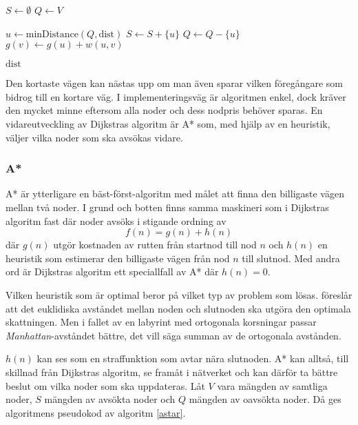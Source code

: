 \documentclass[11pt]{article}
\begin{document}
\begin{flushleft}
\begin{algorithm}
\begin{algorithmic}[1]
			\State $S \gets \emptyset$
			\State $Q \gets V$
			
				\State $u \gets \textrm{minDistance}(Q,\textrm{dist})$%
				\State $S \gets S +  \{ u\}$
				\State $Q \gets Q - \{ u\}$
						\State $g(v) \gets g(u) + w(u,v)$
					\EndIf
				\EndFor
			\EndWhile
			
			\Return $\textrm{dist}$
		\EndFunction
	\end{algorithmic}
\end{algorithm}

Den kortaste vägen kan nästas upp om man även sparar vilken föregångare som bidrog till en kortare väg. I implementeringsväg är algoritmen enkel, dock kräver den mycket minne eftersom alla noder och dess nodpris behöver sparas. En vidareutveckling av Dijkstras algoritm är A* som, med hjälp av en heuristik, väljer vilka noder som ska avsökas vidare.

\subsubsection{A*}
A* är ytterligare en bäst-först-algoritm med målet att finna den billigaste vägen mellan två noder. I grund och botten finns samma maskineri som i Dijkstras algoritm fast där noder avsöks i stigande ordning av
\begin{equation*}
	f(n) = g(n) + h(n)
\end{equation*}
där $g(n)$ utgör kostnaden av rutten från startnod till nod $n$ och $h(n)$ en heuristik som estimerar den billigaste vägen från nod $n$ till slutnod. Med andra ord är Dijkstras algoritm ett speciallfall av A* där $h(n) = 0$.

Vilken heuristik som är optimal beror på vilket typ av problem som lösas. \cite{aStar} föreslår att det euklidiska avståndet mellan noden och slutnoden ska utgöra den optimala skattningen. Men i fallet av en labyrint med ortogonala korsningar passar \emph{Manhattan}-avståndet bättre, det vill säga summan av de ortogonala avstånden.

$h(n)$ kan ses som en straffunktion som avtar nära slutnoden. A* kan alltså, till skillnad från Dijkstras algoritm, se framåt i nätverket och kan därför ta bättre beslut om vilka noder som ska uppdateras. Låt $V$ vara mängden av samtliga noder, $S$ mängden av avsökta noder och $Q$ mängden av oavsökta noder. Då ges algoritmens pseudokod av algoritm \ref{astar}.


\end{flushleft}
\end{document}
